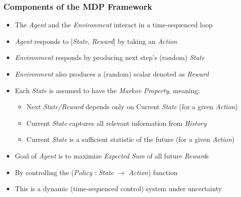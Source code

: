\documentclass[handout]{beamer}
\begin{document}
\begin{frame}
\frametitle{Components of the MDP Framework}
\pause
\begin{itemize}[<+->]
\item The {\em Agent} and the {\em Environment} interact in a time-sequenced loop
\item {\em Agent} responds to [{\em State}, {\em Reward}] by taking an {\em Action}
\item {\em Environment} responds by producing next step's (random) {\em State}
\item {\em Environment} also produces a (random) scalar denoted as {\em Reward}
\item Each {\em State} is assumed to have the {\em Markov Property}, meaning:
\begin{itemize}
\item Next {\em State/Reward} depends only on Current {\em State} (for a given {\em Action})
\item Current {\em State} captures all relevant information from {\em History}
\item Current {\em State} is a sufficient statistic of the future (for a given {\em Action})
\end{itemize} 
\item Goal of {\em Agent} is to maximize {\em Expected Sum} of all future {\em Reward}s
\item By controlling the ({\em Policy} : {\em State} $\rightarrow$ {\em Action}) function
\item This is a dynamic (time-sequenced control) system under uncertainty
\end{itemize}
\end{frame}
\end{document}
